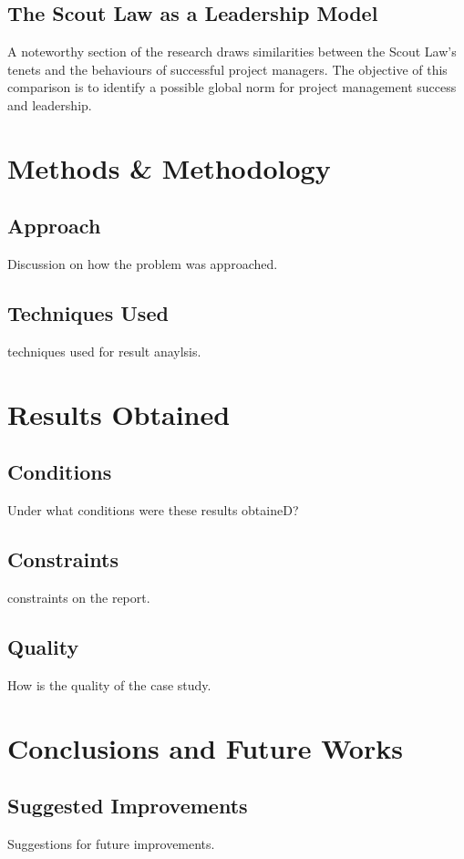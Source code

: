\documentclass{article}
\begin{document}
\subsection{The Scout Law as a Leadership Model}
A noteworthy section of the research draws similarities between the Scout Law's tenets and the behaviours of successful project managers. The objective of this comparison is to identify a possible global norm for project management success and leadership.

\section{Methods \& Methodology}
\subsection{Approach}
Discussion on how the problem was approached.

\subsection{Techniques Used}
techniques used for result anaylsis.

\section{Results Obtained}
\subsection{Conditions}
Under what conditions were these results obtaineD?

\subsection{Constraints}
constraints on the report.

\subsection{Quality}
How is the quality of the case study.

\section{Conclusions and Future Works}
\subsection{Suggested Improvements}
Suggestions for future improvements.
\end{document}
